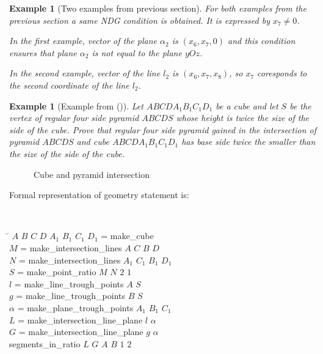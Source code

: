 \documentclass[final,1p,times,authoryear]{elsarticle}
\newtheorem{example}[theorem]{Example}
\begin{document}
\begin{example}[Two examples from previous section]
  For both examples from the previous section a same NDG condition is
  obtained. It is expressed by $x_7 \neq 0$. 

  In the first example, vector of the plane $\alpha_2$ is $(x_6, x_7,
  0)$ and this condition ensures that plane $\alpha_2$ is not equal to
  the plane $yOz$.

  In the second example, vector of the line $l_2$ is $(x_6, x_7,
  x_8)$, so $x_7$ coresponds to the second coordinate of the line
  $l_2$.
\end{example}

\begin{example}[Example from (\cite{arhzbirka})] 
\label{ex:kockapiramida}
Let $ABCDA_1B_1C_1D_1$ be a cube and let $S$ be the vertex of regular
four side pyramid $ABCDS$ whose height is twice the size of the side
of the cube. Prove that regular four side pyramid gained in the
intersection of pyramid $ABCDS$ and cube $ABCDA_1B_1C_1D_1$ has base
side twice the smaller than the size of the side of the cube.
\end{example}

\begin{figure}[!h]
\begin{center}

\end{center}
\caption{Cube and pyramid intersection}
\end{figure}

Formal representation of geometry statement is:
\begin{footnotesize}
{\tt
\begin{tabbing}
\hspace{5mm}\=\kill
\> $A$ $B$ $C$ $D$ $A_1$ $B_1$ $C_1$ $D_1$ = make\_cube\\
\> $M$ = make\_intersection\_lines $A$ $C$ $B$ $D$\\
\> $N$ = make\_intersection\_lines $A_1$ $C_1$ $B_1$ $D_1$\\
\> $S$ = make\_point\_ratio $M$ $N$ $2$ $1$\\ 
\> $l$ = make\_line\_trough\_points $A$ $S$ \\
\> $g$ = make\_line\_trough\_points $B$ $S$\\
\> $\alpha$ = make\_plane\_trough\_points $A_1$ $B_1$ $C_1$\\
\> $L$ = make\_intersection\_line\_plane $l$ $\alpha$\\
\> $G$ = make\_intersection\_line\_plane $g$ $\alpha$\\
\>segments\_in\_ratio $L$ $G$ $A$ $B$ $1$ $2$
\end{tabbing}
}
\end{footnotesize}
\end{document}
